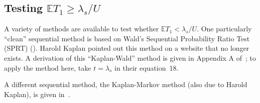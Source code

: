 \subsection{Testing $\mathbb{E} T_1 \ge \lambda_s/U$}

A variety of methods are available to test whether $\mathbb{E} T_1 < \lambda_s/U$.
One particularly ``clean'' sequential method is based on Wald's Sequential Probability
Ratio Test (SPRT) (\cite{wald45}).
Harold Kaplan pointed out this method on a website that no longer exists.
A derivation of this ``Kaplan-Wald'' method is given in Appendix A of~\cite{starkTeague14};
to apply the method here, take $t = \lambda_s$ in their equation~18.

A different sequential method, the Kaplan-Markov method (also due to Harold Kaplan), 
is given in~\cite{stark09b}.
